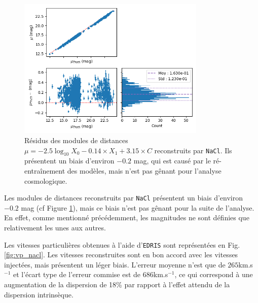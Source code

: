 \documentclass{book}
\def\nacl{\texttt{NaCl}\xspace}
\def\edris{\texttt{EDRIS}\xspace}
\begin{document}
\begin{figure}
    \centering
    \includegraphics[width=0.8\textwidth]{figures/nacl_mu.png}
    \caption{Résidus des modules de distances $\mu = -2.5\log_{10} X_0 - 0.14 \times X_1 + 3.15 \times  C$ reconstruits par \nacl. Ils présentent un biais d'environ $-0.2$ mag, qui est causé par le ré-entraînement des modèles, mais n'est pas gênant pour l'analyse cosmologique.}
    \label{fig:nacl_mu}
\end{figure}
Les modules de distances reconstruits par \nacl présentent un biais d'environ $-0.2$ mag (cf Figure \ref{fig:nacl_mu}), mais ce biais n'est pas gênant pour la suite de l'analyse. En effet, comme mentionné précédemment, les magnitudes ne sont définies que relativement les unes aux autres.

Les vitesses particulières obtenues à l'aide d'\edris sont représentées en Fig. \ref{fig:vp_nacl}. Les vitesses reconstruites sont en bon accord avec les vitesses injectées, mais présentent un léger biais. L'erreur moyenne n'est que de $265$km.s$^{-1}$ et l'écart type de l'erreur commise est de $686$km.s$^{-1}$, ce qui correspond à une augmentation de la dispersion de 18\% par rapport à l'effet attendu de la dispersion intrinsèque.
\end{document}
